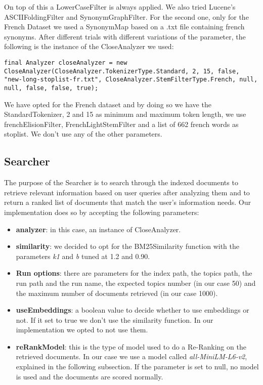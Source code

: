 On top of this a LowerCaseFilter is always applied.
\newline
We also tried Lucene's ASCIIFoldingFilter and SynonymGraphFilter. For the second one, only for the French Dataset we used a SynonymMap based on a .txt file containing french synonyms.
\newline
After different trials with different variations of the parameter, the following is the instance of the CloseAnalyzer we used:

\begin{lstlisting}
final Analyzer closeAnalyzer = new CloseAnalyzer(CloseAnalyzer.TokenizerType.Standard, 2, 15, false, "new-long-stoplist-fr.txt", CloseAnalyzer.StemFilterType.French, null, null, false, false, true);
\end{lstlisting}
We have opted for the French dataset and by doing so we have the StandardTokenizer, 2 and 15 as minimum and maximum token length, we use frenchElisionFilter, FrenchLightStemFilter and a list of 662 french words as stoplist. We don't use any of the other parameters.




\subsection{Searcher}
The purpose of the Searcher is to search through the indexed documents to retrieve relevant information based on user queries after analyzing them and to
return a ranked list of documents that match the user’s information needs.
\newline
Our implementation does so by accepting the following parameters:
\begin{itemize}
  \item \textbf{analyzer}: in this case, an instance of CloseAnalyzer.
  \item \textbf{similarity}: we decided to opt for the BM25Similarity function with the parameters \textit{k1} and \textit{b} tuned at 1.2 and 0.90.
  \item \textbf{Run options}: there are parameters for the index path, the topics path, the run path and the run name, the expected topics number (in our case 50) and the maximum number of documents retrieved (in our case 1000).
  \item \textbf{useEmbeddings}: a boolean value to decide whether to use embeddings or not. If it set to true we don't use the similarity function. In our implementation we opted to not use them.
  \item \textbf{reRankModel}: this is the type of model used to do a Re-Ranking on the retrieved documents. In our case we use a model called \textit{all-MiniLM-L6-v2}, explained in the following subsection. If the parameter is set to null, no model is used and the documents are scored normally.
\end{itemize}

